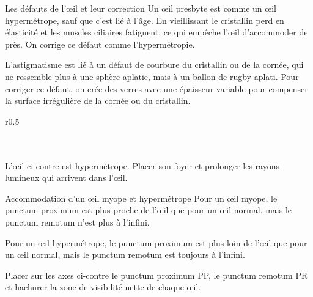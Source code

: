\begin{doc}{Les défauts de l'œil et leur correction}
  Un œil presbyte est comme un œil hypermétrope, sauf que c'est lié à l'âge.
  En vieillissant le cristallin perd en élasticité et les muscles ciliaires fatiguent, ce qui empêche l'œil d'accommoder de près.
  On corrige ce défaut comme l'hypermétropie.

  \pointCyan {}

  L'astigmatisme est lié à un défaut de courbure du cristallin ou de la cornée, qui ne ressemble plus à une sphère aplatie, mais à un ballon de rugby aplati.
  Pour corriger ce défaut, on crée des verres avec une épaisseur variable pour compenser la surface irrégulière de la cornée ou du cristallin.
\end{doc}

\begin{wrapfigure}[10]{r}{0.5\linewidth}
  \centering
  \vspace*{-18pt}
   \\
   \\[8pt]

   \\
\end{wrapfigure}

\schematisation
L'œil ci-contre est hypermétrope.
Placer son foyer et prolonger les rayons lumineux qui arrivent dans l'œil.

\begin{doc}{Accommodation d'un œil myope et hypermétrope}
  Pour un œil myope, le punctum proximum est plus proche de l'œil que pour un œil normal, mais le punctum remotum n'est plus à l'infini.

  Pour un œil hypermétrope, le punctum proximum est plus loin de l'œil que pour un œil normal, mais le punctum remotum est toujours à l'infini.
\end{doc}

\schematisation
Placer sur les axes ci-contre le punctum proximum PP, le punctum remotum PR et hachurer la zone de visibilité nette de chaque œil.